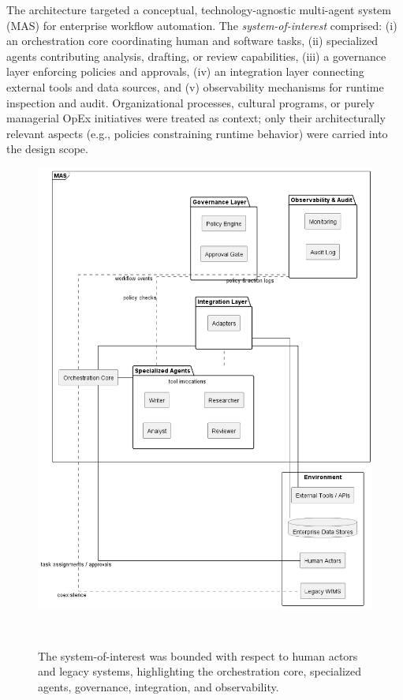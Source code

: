 The architecture targeted a conceptual, technology-agnostic multi-agent system (MAS) for enterprise workflow automation. The \emph{system-of-interest} comprised: (i) an orchestration core coordinating human and software tasks, (ii) specialized agents contributing analysis, drafting, or review capabilities, (iii) a governance layer enforcing policies and approvals, (iv) an integration layer connecting external tools and data sources, and (v) observability mechanisms for runtime inspection and audit. Organizational processes, cultural programs, or purely managerial OpEx initiatives were treated as context; only their architecturally relevant aspects (e.g., policies constraining runtime behavior) were carried into the design scope.

\begin{figure}[H]
  \centering
  \includegraphics[width=0.7\linewidth]{ressources/MAS/figures/5_1a_scope_boundary.png}
  \caption{The system-of-interest was bounded with respect to human actors and legacy systems, highlighting the orchestration core, specialized agents, governance, integration, and observability.}~\label{fig:5.1a-scope-boundary}
\end{figure}

